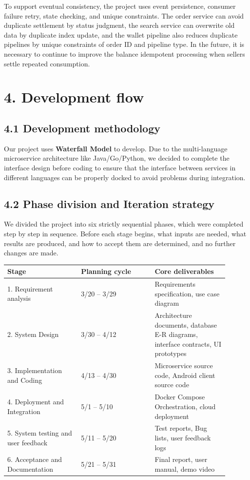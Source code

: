 \documentclass{article}
\begin{document}
To support eventual consistency, the project uses event persistence, consumer failure retry, state checking, and unique constraints. The order service can avoid duplicate settlement by status judgment, the search service can overwrite old data by duplicate index update, and the wallet pipeline also reduces duplicate pipelines by unique constraints of order ID and pipeline type. In the future, it is necessary to continue to improve the balance idempotent processing when sellers settle repeated consumption.

\section{4. Development flow}

\subsection{4.1 Development methodology}

Our project uses \textbf{Waterfall Model} to develop. Due to the multi-language microservice architecture like Java/Go/Python, we decided to complete the interface design before coding to ensure that the interface between services in different languages can be properly docked to avoid problems during integration.

\subsection{4.2 Phase division and Iteration strategy}

We divided the project into six strictly sequential phases, which were completed step by step in sequence. Before each stage begins, what inputs are needed, what results are produced, and how to accept them are determined, and no further changes are made.

\begin{longtable}{p{0.30\linewidth}p{0.30\linewidth}p{0.30\linewidth}}
\toprule
\textbf{Stage} & \textbf{Planning cycle} & \textbf{Core deliverables} \\
\midrule
1. Requirement analysis & 3/20 – 3/29 & Requirements specification, use case diagram \\
2. System Design & 3/30 – 4/12 & Architecture documents, database E-R diagrams, interface contracts, UI prototypes \\
3. Implementation and Coding & 4/13 – 4/30 & Microservice source code, Android client source code \\
4. Deployment and Integration & 5/1 – 5/10 & Docker Compose Orchestration, cloud deployment \\
5. System testing and user feedback & 5/11 – 5/20 & Test reports, Bug lists, user feedback logs \\
6. Acceptance and Documentation & 5/21 – 5/31 & Final report, user manual, demo video \\
\bottomrule
\end{longtable}
\end{document}
